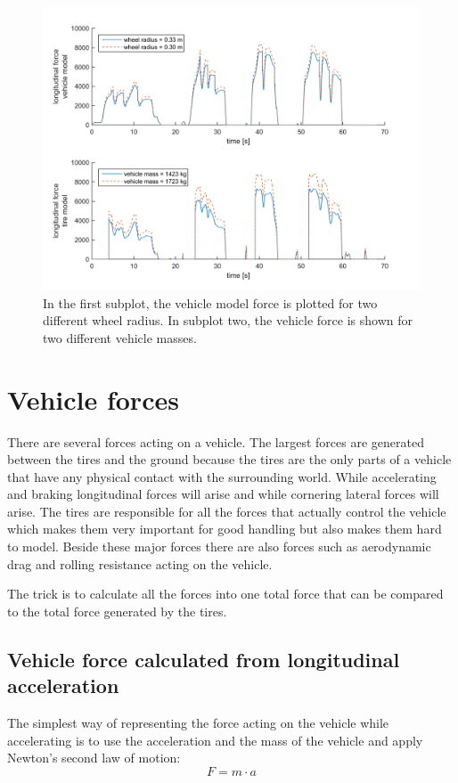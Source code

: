 \begin{figure}[h]
	\centering
	\includegraphics[width=1.0\textwidth]{Pictures/force_diff_re_mass}
	\caption {In the first subplot, the vehicle model force is plotted for two different wheel radius. In subplot two, the vehicle force is shown for two different vehicle masses.}
	\label{force_diff_re_mass}
\end{figure}

\section{Vehicle forces}
There are several forces acting on a vehicle. The largest forces are generated between the tires and the ground because the tires are the only parts of a vehicle that have any physical contact with the surrounding world. While accelerating and braking longitudinal forces will arise and while cornering lateral forces will arise. The tires are responsible for all the forces that actually control the vehicle which makes them very important for good handling but also makes them hard to model. Beside these major forces there are also forces such as aerodynamic drag and rolling resistance acting on the vehicle.

The trick is to calculate all the forces into one total force that can be compared to the total force generated by the tires.
\subsection{Vehicle force calculated from longitudinal acceleration}
The simplest way of representing the force acting on the vehicle while accelerating is to use the acceleration and the mass of the vehicle and apply Newton's second law of motion:
\begin{equation}
	F = m \cdot a
\end{equation}

